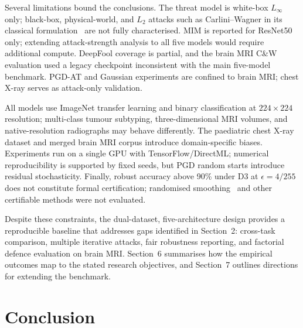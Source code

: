 \documentclass[12pt,a4paper,oneside]{report}
\begin{document}

Several limitations bound the conclusions. The threat model is white-box $L_\infty$ only; black-box, physical-world, and $L_2$ attacks such as Carlini--Wagner in its classical formulation~\cite{carlini2017towards} are not fully characterised. MIM is reported for ResNet50 only; extending attack-strength analysis to all five models would require additional compute. DeepFool coverage is partial, and the brain MRI C\&W evaluation used a legacy checkpoint inconsistent with the main five-model benchmark. PGD-AT and Gaussian experiments are confined to brain MRI; chest X-ray serves as attack-only validation.

All models use ImageNet transfer learning and binary classification at $224 \times 224$ resolution; multi-class tumour subtyping, three-dimensional MRI volumes, and native-resolution radiographs may behave differently. The paediatric chest X-ray dataset and merged brain MRI corpus introduce domain-specific biases. Experiments run on a single GPU with TensorFlow/DirectML; numerical reproducibility is supported by fixed seeds, but PGD random starts introduce residual stochasticity. Finally, robust accuracy above 90\% under D3 at $\epsilon = 4/255$ does not constitute formal certification; randomised smoothing~\cite{cohen2019certified} and other certifiable methods were not evaluated.

Despite these constraints, the dual-dataset, five-architecture design provides a reproducible baseline that addresses gaps identified in Section~2: cross-task comparison, multiple iterative attacks, fair robustness reporting, and factorial defence evaluation on brain MRI. Section~6 summarises how the empirical outcomes map to the stated research objectives, and Section~7 outlines directions for extending the benchmark.

\chapter{Conclusion}
\label{ch:conclusion}

\end{document}
